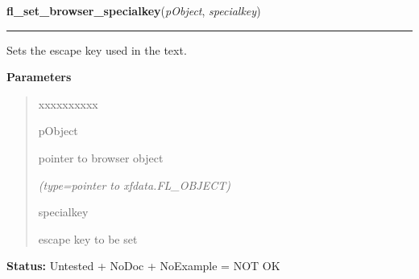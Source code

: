 \hspace{.8\funcindent}\begin{boxedminipage}{\funcwidth}

    \raggedright \textbf{fl\_set\_browser\_specialkey}(\textit{pObject}, \textit{specialkey})

    \vspace{-1.5ex}

    \rule{\textwidth}{0.5\fboxrule}
\setlength{\parskip}{2ex}
    Sets the escape key used in the text.

\setlength{\parskip}{1ex}
      \textbf{Parameters}
      \vspace{-1ex}

      \begin{quote}
        \begin{Ventry}{xxxxxxxxxx}

          \item[pObject]

          pointer to browser object

            {\it (type=pointer to xfdata.FL\_OBJECT)}

          \item[specialkey]

          escape key to be set

        \end{Ventry}

      \end{quote}

\textbf{Status:} Untested + NoDoc + NoExample = NOT OK



    \end{boxedminipage}

    \label{xformslib:library:fl_set_browser_vscrollbar}

    \vspace{0.5ex}

